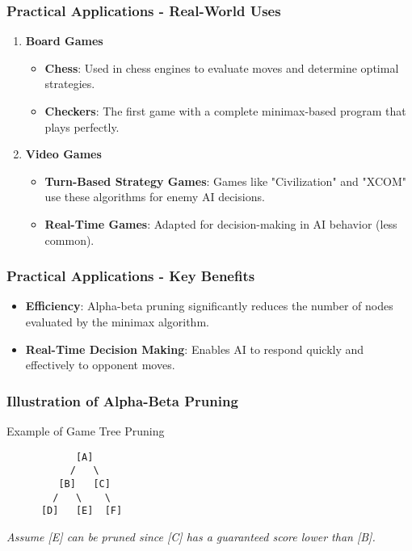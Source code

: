 \documentclass[aspectratio=169]{beamer}
\begin{document}
\begin{frame}[fragile]
    \frametitle{Practical Applications - Real-World Uses}
    \begin{enumerate}
        \item \textbf{Board Games}
            \begin{itemize}
                \item \textbf{Chess}: Used in chess engines to evaluate moves and determine optimal strategies.
                \item \textbf{Checkers}: The first game with a complete minimax-based program that plays perfectly.
            \end{itemize}
        \item \textbf{Video Games}
            \begin{itemize}
                \item \textbf{Turn-Based Strategy Games}: Games like "Civilization" and "XCOM" use these algorithms for enemy AI decisions.
                \item \textbf{Real-Time Games}: Adapted for decision-making in AI behavior (less common).
            \end{itemize}
    \end{enumerate}
\end{frame}

\begin{frame}[fragile]
    \frametitle{Practical Applications - Key Benefits}
    \begin{itemize}
        \item \textbf{Efficiency}: Alpha-beta pruning significantly reduces the number of nodes evaluated by the minimax algorithm.
        \item \textbf{Real-Time Decision Making}: Enables AI to respond quickly and effectively to opponent moves.
    \end{itemize}
\end{frame}

\begin{frame}[fragile]
    \frametitle{Illustration of Alpha-Beta Pruning}
    \begin{block}{Example of Game Tree Pruning}
    \begin{verbatim}
            [A]
           /   \
         [B]   [C]
        /   \    \
      [D]   [E]  [F]
    \end{verbatim}
    \end{block}
    \textit{Assume [E] can be pruned since [C] has a guaranteed score lower than [B].}
\end{frame}
\end{document}
